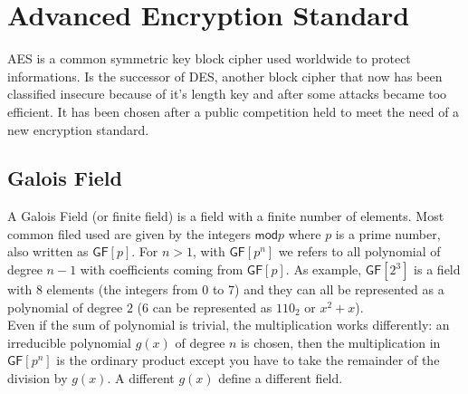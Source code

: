 \section{Advanced Encryption Standard}
AES is a common symmetric key block cipher used worldwide to protect informations. Is the successor of DES, another block cipher that now has been classified insecure because of it's length key and after some attacks became too efficient. It has been chosen after a public competition held to meet the need of a new encryption standard.\\

\subsection{Galois Field}
A Galois Field (or finite field) is a field with a finite number of elements. Most common filed used are given by the integers $\mathsf{mod} p$ where $p$ is a prime number, also written as $\mathsf{GF}[p]$. For $n > 1$, with $\mathsf{GF}[p^n]$ we refers to all polynomial of degree $n-1$ with coefficients coming from $\mathsf{GF}[p]$. As example, $\mathsf{GF}[2^3]$ is a field with $8$ elements (the integers from 0 to 7) and they can all be represented as a polynomial of degree $2$ (6 can be represented as $110_2$ or $x^2+x$).\\
Even if the sum of polynomial is trivial, the multiplication works differently: an irreducible polynomial $g(x)$ of degree $n$ is chosen, then the multiplication in $\mathsf{GF}[p^n]$ is the ordinary product except you have to take the remainder of the division by $g(x)$. A different $g(x)$ define a different field.

